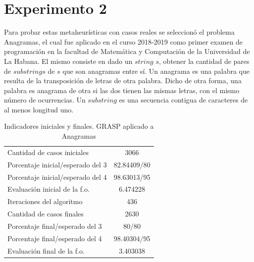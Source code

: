 \documentclass[a4paper,openright,11pt,oneside]{book}
\begin{document}
	\section{Experimento 2}
		Para probar estas metaheurísticas con casos reales se seleccionó el problema Anagramas, el cual fue aplicado en el curso 2018-2019 como primer examen de programación en la facultad de Matemática y Computación de la Universidad de La Habana. El mismo consiste en dado un $string$ $s$, obtener la cantidad de pares de $substrings$ de $s$ que son anagramas entre sí. Un anagrama es una palabra que resulta de la transposición de letras de otra palabra. Dicho de otra forma, una palabra es anagrama de otra si las dos tienen las mismas letras, con el mismo número de ocurrencias. Un $substring$ es una secuencia contigua de caracteres de al menos longitud uno.
		
		\begin{table}[h]
			\begin{center}
				\begin{tabular}{| l | c |} \hline
					Cantidad de casos iniciales & 3066 \\
					Porcentaje inicial/esperado del 3 & 82.84409/80 \\
					Porcentaje inicial/esperado del 4 & 98.63013/95 \\
					Evaluación inicial de la f.o. & 6.474228 \\ \hline
					Iteraciones del algoritmo & 436 \\ \hline
					Cantidad de casos finales & 2630 \\
					Porcentaje final/esperado del 3 & 80/80 \\
					Porcentaje final/esperado del 4 & 98.40304/95 \\
					Evaluación final de la f.o. & 3.403038 \\ \hline
				\end{tabular}
				\caption{Indicadores iniciales y finales. GRASP aplicado a Anagramas}
				\label{tab:IndicadoresAnaGRASP1}
			\end{center}
		\end{table}
	
\end{document}
